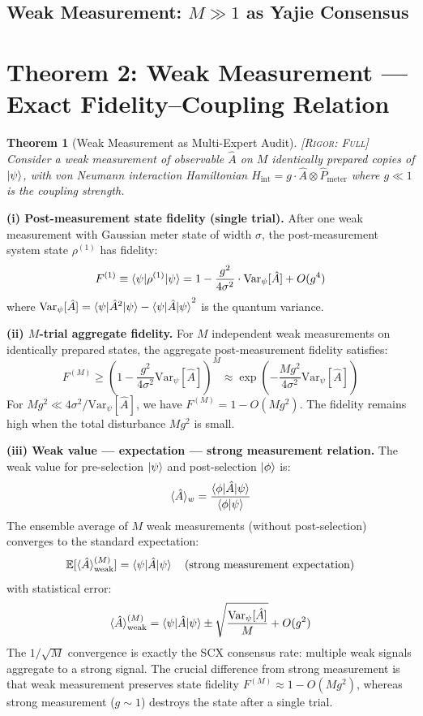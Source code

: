 \documentclass[11pt,a4paper]{article}
\newtheorem{theorem}{Theorem}[section]
\theoremstyle{definition}
\theoremstyle{remark}
\newcommand{\E}{\mathbb{E}}
\newcommand{\brak}[1]{\langle #1 \rangle}
\newcommand{\rigorFull}{\textsc{[Rigor: Full]}}
\newcommand{\Var}{\mathrm{Var}}
\begin{document}
\subsection{Weak Measurement: $M \gg 1$ as Yajie Consensus}

\section{Theorem 2: Weak Measurement --- Exact Fidelity--Coupling Relation}

\begin{theorem}[Weak Measurement as Multi-Expert Audit]
\label{thm:weak-measurement}
\rigorFull
Consider a weak measurement of observable $\hat{A}$ on $M$ identically prepared copies of $\ket{\psi}$, with von Neumann interaction Hamiltonian $\hat{H}_{\text{int}} = g \cdot \hat{A} \otimes \hat{P}_{\text{meter}}$ where $g \ll 1$ is the coupling strength.
\end{theorem}

\medskip
\noindent\textbf{(i) Post-measurement state fidelity (single trial).}
After one weak measurement with Gaussian meter state of width $\sigma$, the post-measurement system state $\rho^{(1)}$ has fidelity:
\[
F^{(1)} \equiv \braket{\psi|\rho^{(1)}|\psi} = 1 - \frac{g^2}{4\sigma^2} \cdot \Var_{\psi}[\hat{A}] + O(g^4)
\]
where $\Var_{\psi}[\hat{A}] = \braket{\psi|\hat{A}^2|\psi} - \braket{\psi|\hat{A}|\psi}^2$ is the quantum variance.

\noindent\textbf{(ii) $M$-trial aggregate fidelity.}
For $M$ independent weak measurements on identically prepared states, the aggregate post-measurement fidelity satisfies:
\[
F^{(M)} \geq \left(1 - \frac{g^2}{4\sigma^2} \Var_{\psi}[\hat{A}]\right)^{M} \approx \exp\!\left(-\frac{M g^2}{4\sigma^2} \Var_{\psi}[\hat{A}]\right)
\]
For $M g^2 \ll 4\sigma^2 / \Var_{\psi}[\hat{A}]$, we have $F^{(M)} = 1 - O(M g^2)$. The fidelity remains high when the total disturbance $M g^2$ is small.

\noindent\textbf{(iii) Weak value --- expectation --- strong measurement relation.}
The weak value for pre-selection $\ket{\psi}$ and post-selection $\ket{\phi}$ is:
\[
\brak{\hat{A}}_w = \frac{\braket{\phi|\hat{A}|\psi}}{\braket{\phi|\psi}}
\]
The ensemble average of $M$ weak measurements (without post-selection) converges to the standard expectation:
\[
\E[\brak{\hat{A}}_{\text{weak}}^{(M)}] = \braket{\psi|\hat{A}|\psi} \quad \text{(strong measurement expectation)}
\]
with statistical error:
\[
\brak{\hat{A}}_{\text{weak}}^{(M)} = \braket{\psi|\hat{A}|\psi} \pm \sqrt{\frac{\Var_{\psi}[\hat{A}]}{M}} + O(g^2)
\]
The $1/\sqrt{M}$ convergence is exactly the SCX consensus rate: multiple weak signals aggregate to a strong signal. The crucial difference from strong measurement is that weak measurement preserves state fidelity $F^{(M)} \approx 1 - O(M g^2)$, whereas strong measurement ($g \sim 1$) destroys the state after a single trial.
\end{document}
